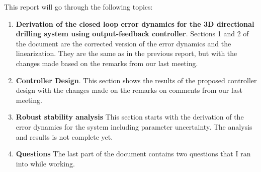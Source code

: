 \documentclass[main.tex]{subfiles}
\begin{document}
	
This report will go through the following topics:

\begin{enumerate}
	\item \textbf{Derivation of the closed loop error dynamics for the 3D directional drilling system using output-feedback controller}. Sections 1 and 2 of the document are the corrected version of the error dynamics and the linearization. They are the same as in the previous report, but with the changes made based on the remarks from our last meeting.
	\item \textbf{Controller Design}. This section shows the results of the proposed controller design with the changes made on the remarks on comments from our last meeting.
	\item \textbf{Robust stability analysis} This section starts with the derivation of the error dynamics for the system including parameter uncertainty. The analysis and results is not complete yet.
	\item \textbf{Questions} The last part of the document contains two questions that I ran into while working.
\end{enumerate}
\end{document}
